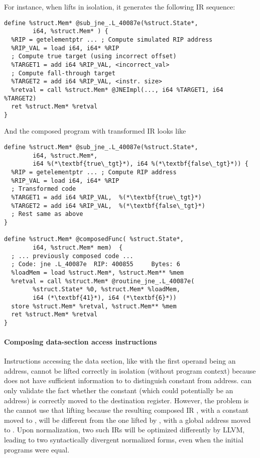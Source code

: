 For instance, when \mcsema lifts  in isolation,
it generates the following IR sequence:
\begin{lstlisting}[style=LLVM]
define %struct.Mem* @sub_jne_.L_40087e(%struct.State*, 
        i64, %struct.Mem* ) {
  %RIP = getelementptr ... ; Compute simulated RIP address
  %RIP_VAL = load i64, i64* %RIP
  ; Compute true target (using incorrect offset)
  %TARGET1 = add i64 %RIP_VAL, <incorrect_val>
  ; Compute fall-through target
  %TARGET2 = add i64 %RIP_VAL, <instr. size>
  %retval = call %struct.Mem* @JNEImpl(..., i64 %TARGET1, i64 %TARGET2)
  ret %struct.Mem* %retval
}
\end{lstlisting}

And the composed program with transformed IR looks like
\begin{lstlisting}[style=LLVM]
define %struct.Mem* @sub_jne_.L_40087e(%struct.State*, 
        i64, %struct.Mem*,
        i64 %(*\textbf{true\_tgt}*), i64 %(*\textbf{false\_tgt}*)) {
  %RIP = getelementptr ... ; Compute RIP address
  %RIP_VAL = load i64, i64* %RIP
  ; Transformed code
  %TARGET1 = add i64 %RIP_VAL,  %(*\textbf{true\_tgt}*)
  %TARGET2 = add i64 %RIP_VAL,  %(*\textbf{false\_tgt}*)
  ; Rest same as above
}

define %struct.Mem* @composedFunc( %struct.State*, 
        i64, %struct.Mem* mem)  {
  ; ... previously composed code ...
  ; Code: jne .L_40087e	 RIP: 400855	 Bytes: 6
  %loadMem = load %struct.Mem*, %struct.Mem** %mem
  %retval = call %struct.Mem* @routine_jne_.L_40087e(
        %struct.State* %0, %struct.Mem* %loadMem, 
        i64 (*\textbf{41}*), i64 (*\textbf{6}*))
  store %struct.Mem* %retval, %struct.Mem** %mem
  ret %struct.Mem* %retval
}
\end{lstlisting}

\paragraph{Composing data-section access instructions}
Instructions accessing the data section, like 
with the first operand being an address, cannot be lifted correctly in
isolation (without program context) because \mcsema does not have sufficient information to to distinguish constant from address. 
\Siv can only validate the fact whether the constant
(which could potentially be an address) is correctly moved to the destination register. 
However, the problem is the \plv cannot use that lifting because the resulting 
composed IR , with a constant moved to , will be   
different from the
one lifted by \mcsema {}, with a global address moved to .
Upon normalization, two such IRs will be optimized differently by LLVM, leading to two syntactically 
divergent normalized forms, even when the initial programs were equal.


